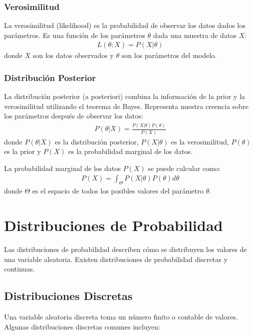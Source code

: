 \subsubsection{Verosimilitud}

La verosimilitud (likelihood) es la probabilidad de observar los datos dados los par\'ametros. Es una funci\'on de los par\'ametros $\theta$ dada una muestra de datos $X$:
\begin{eqnarray*}
L(\theta; X) = P(X|\theta)
\end{eqnarray*}
donde $X$ son los datos observados y $\theta$ son los par\'ametros del modelo.

\subsubsection{Distribuci\'on Posterior}

La distribuci\'on posterior (a posteriori) combina la informaci\'on de la prior y la verosimilitud utilizando el teorema de Bayes. Representa nuestra creencia sobre los par\'ametros despu\'es de observar los datos:
\begin{eqnarray*}
P(\theta|X) = \frac{P(X|\theta)P(\theta)}{P(X)}
\end{eqnarray*}
donde $P(\theta|X)$ es la distribuci\'on posterior, $P(X|\theta)$ es la verosimilitud, $P(\theta)$ es la prior y $P(X)$ es la probabilidad marginal de los datos.

La probabilidad marginal de los datos $P(X)$ se puede calcular como:
\begin{eqnarray*}
P(X) = \int_{\Theta} P(X|\theta)P(\theta) d\theta
\end{eqnarray*}
donde $\Theta$ es el espacio de todos los posibles valores del par\'ametro $\theta$.

\section{Distribuciones de Probabilidad}

Las distribuciones de probabilidad describen c\'omo se distribuyen los valores de una variable aleatoria. Existen distribuciones de probabilidad discretas y continuas.

\subsection{Distribuciones Discretas}

Una variable aleatoria discreta toma un n\'umero finito o contable de valores. Algunas distribuciones discretas comunes incluyen:


